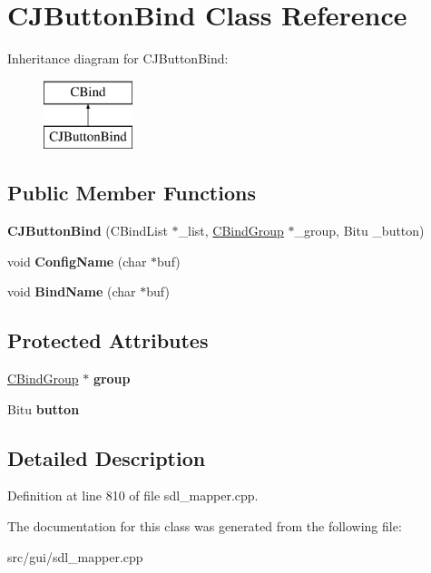 \hypertarget{classCJButtonBind}{\section{C\-J\-Button\-Bind Class Reference}
\label{classCJButtonBind}
}
Inheritance diagram for C\-J\-Button\-Bind\-:\begin{figure}[H]
\begin{center}
\leavevmode
\includegraphics[height=2.000000cm]{classCJButtonBind}
\end{center}
\end{figure}
\subsection*{Public Member Functions}
\begin{DoxyCompactItemize}
\item 
\hypertarget{classCJButtonBind_a087e9681558df38907c7d57a373ec115}{{\bfseries C\-J\-Button\-Bind} (C\-Bind\-List $\ast$\-\_\-list, \hyperlink{classCBindGroup}{C\-Bind\-Group} $\ast$\-\_\-group, Bitu \-\_\-button)}\label{classCJButtonBind_a087e9681558df38907c7d57a373ec115}

\item 
\hypertarget{classCJButtonBind_a0aae6d69719dfb37dc2e1ed722663ec0}{void {\bfseries Config\-Name} (char $\ast$buf)}\label{classCJButtonBind_a0aae6d69719dfb37dc2e1ed722663ec0}

\item 
\hypertarget{classCJButtonBind_a948fa272e3164f85522f7b1ece2ae49f}{void {\bfseries Bind\-Name} (char $\ast$buf)}\label{classCJButtonBind_a948fa272e3164f85522f7b1ece2ae49f}

\end{DoxyCompactItemize}
\subsection*{Protected Attributes}
\begin{DoxyCompactItemize}
\item 
\hypertarget{classCJButtonBind_ade264023f83ad0202a6c5a2340d46833}{\hyperlink{classCBindGroup}{C\-Bind\-Group} $\ast$ {\bfseries group}}\label{classCJButtonBind_ade264023f83ad0202a6c5a2340d46833}

\item 
\hypertarget{classCJButtonBind_a6ef33ff006d574b8ea0df3ac18bf1a7a}{Bitu {\bfseries button}}\label{classCJButtonBind_a6ef33ff006d574b8ea0df3ac18bf1a7a}

\end{DoxyCompactItemize}


\subsection{Detailed Description}


Definition at line 810 of file sdl\-\_\-mapper.\-cpp.



The documentation for this class was generated from the following file\-:\begin{DoxyCompactItemize}
\item 
src/gui/sdl\-\_\-mapper.\-cpp\end{DoxyCompactItemize}
